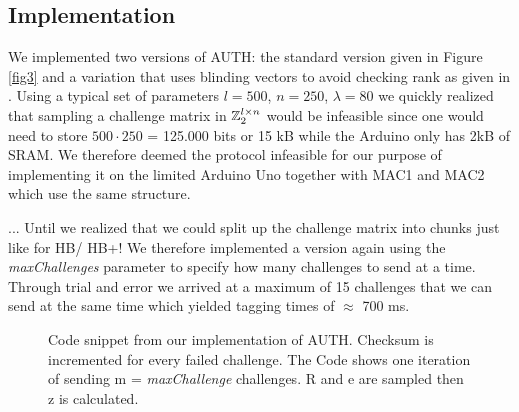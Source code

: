 \documentclass[11pt,a4paper]{article}
\begin{document}
\subsection{Implementation}

We implemented two versions of AUTH: the standard version given in Figure \ref{fig3} and a variation that uses blinding vectors to avoid checking rank as given in \cite{Kiltz2017}. 
Using a typical set of parameters $l=500$, $n=250$, $\lambda = 80$ we quickly realized that sampling a challenge matrix in $\mathbb{Z}_2^{l \times n}$ would be infeasible since one would need to store $500 \cdot 250$ = 125.000 bits or 15 kB while the Arduino only has 2kB of SRAM. We therefore deemed the protocol infeasible for our purpose of implementing it on the limited Arduino Uno together with MAC1 and MAC2 which use the same structure.

... Until we realized that we could split up the challenge matrix into chunks just like for HB/ HB+! We therefore implemented a version again using the \textit{maxChallenges} parameter to specify how many challenges to send at a time. Through trial and error we arrived at a maximum of 15 challenges that we can send at the same time which yielded tagging times of $\approx$ 700 ms.
 
\begin{figure}[h]
	\caption{Code snippet from our implementation of AUTH. Checksum is incremented for every failed challenge. The Code shows one iteration of sending m = \textit{maxChallenge} challenges. R and e are sampled then z is calculated.}
	\label{auth_code1}
\end{figure}

\newpage
\end{document}

